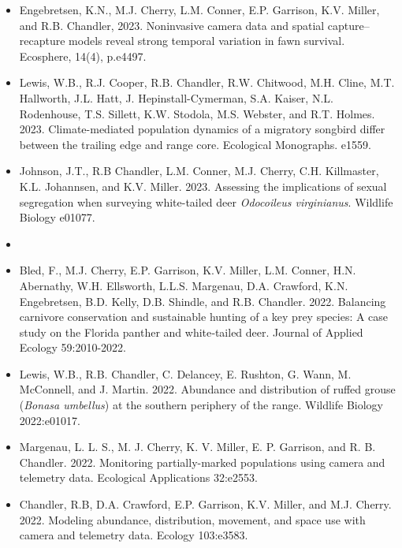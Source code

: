 \documentclass[12pt]{article}
\begin{document}
\begin{itemize}
\item Engebretsen, K.N., M.J. Cherry, L.M. Conner, E.P. Garrison,
  K.V. Miller, and R.B. Chandler, 2023. Noninvasive camera data and
  spatial capture–recapture models reveal strong temporal variation in
  fawn survival. Ecosphere, 14(4), p.e4497. 

\item Lewis, W.B., R.J. Cooper, R.B. Chandler, R.W. Chitwood,
  M.H. Cline, M.T. Hallworth, J.L. Hatt, J. Hepinstall-Cymerman,
  S.A. Kaiser, N.L. Rodenhouse, T.S. Sillett, K.W. Stodola,
  M.S. Webster, and R.T. Holmes. 2023. Climate-mediated population
  dynamics of a migratory songbird differ between the trailing edge
  and range core. Ecological Monographs. e1559. 

\item Johnson, J.T., R.B Chandler, L.M. Conner, M.J. Cherry,
  C.H. Killmaster, K.L. Johannsen, and K.V. Miller. 2023. Assessing
  the implications of sexual segregation when surveying white-tailed
  deer {\it Odocoileus virginianus}. Wildlife Biology e01077. 

  
\item[] { \\}

\item Bled, F., M.J. Cherry, E.P. Garrison, K.V. Miller, L.M. Conner,
  H.N. Abernathy, W.H. Ellsworth, L.L.S. Margenau, D.A. Crawford,
  K.N. Engebretsen, B.D. Kelly, D.B. Shindle, and
  R.B. Chandler. 2022. Balancing carnivore conservation and
  sustainable hunting of a  key prey species: A case study on the
  Florida panther and white‐tailed deer. Journal of Applied Ecology
  59:2010-2022. 
  
\item Lewis, W.B., R.B. Chandler, C. Delancey, E. Rushton, G. Wann, M.
  McConnell, and J. Martin. 2022. Abundance and distribution of
  ruffed grouse ({{\it Bonasa umbellus}}) at the southern periphery of
  the range. Wildlife Biology 2022:e01017. 

\item Margenau, L. L. S., M. J. Cherry, K. V. Miller, E. P. Garrison,
  and R. B. Chandler. 2022. Monitoring partially-marked
  populations using camera and telemetry data. Ecological
  Applications 32:e2553. 

\item Chandler, R.B, D.A. Crawford, E.P. Garrison, K.V. Miller, and
  M.J. Cherry. 2022. Modeling abundance, distribution, movement,
  and space use with camera and telemetry data. Ecology 103:e3583.  


\end{itemize}
\end{document}
